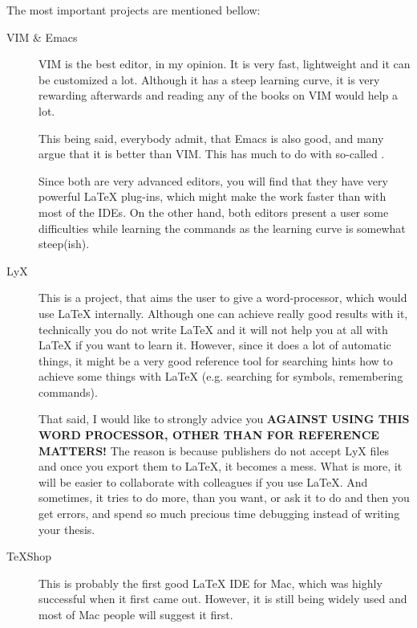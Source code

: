 \documentclass[
    draft
]{scrartcl}
\newcommand{\stress}[1]{\textbf{\uppercase{#1}}}
\begin{document}
%
The most important projects are mentioned bellow:
\begin{description}
    \item[VIM \& Emacs] 
        VIM is the best editor, in my opinion.
        It is very fast, lightweight and it can be customized a lot.
        Although it has a steep learning curve, it is very rewarding afterwards
            and reading any of the books on VIM would help a lot. 
        
        This being said, everybody admit, that Emacs is also good, and many
            argue that it is better than VIM.
        This has much to do with so-called
        .

        Since both are very advanced editors, you will find that they have very
            powerful \LaTeX{} plug-ins, which might make the work faster than
            with most of the IDEs.
        On the other hand, both editors present a user some difficulties while
            learning the commands as the learning curve is somewhat steep(ish).

    \item[LyX] 
        This is a project, that aims the user to give a word-processor, which
            would use \LaTeX{} internally.
        Although one can achieve really good results with it, technically you do
            not write \LaTeX{} and it will not help you at all with \LaTeX{} if
            you want to learn it.
        However, since it does a lot of automatic things, it might be a very
            good reference tool for searching hints how to achieve some things
            with \LaTeX{} (e.g. searching for symbols, remembering commands). 
        
        That said, I would like to strongly advice you \stress{against using
            this word processor, other than for reference matters!}
        The reason is because publishers do not accept LyX files and once you
            export them to \LaTeX{}, it becomes a mess.
        What is more, it will be easier to collaborate with colleagues if you
            use \LaTeX{}.
        And sometimes, it tries to do more, than you want, or ask it to do and
            then you get errors, and spend so much precious time debugging
            instead of writing your thesis.

    \item[\TeX{}Shop] 
        This is probably the first good \LaTeX{} IDE for Mac, which was highly
            successful when it first came out.
        However, it is still being widely used and most of Mac people will
            suggest it first.


\end{description}
\end{document}
